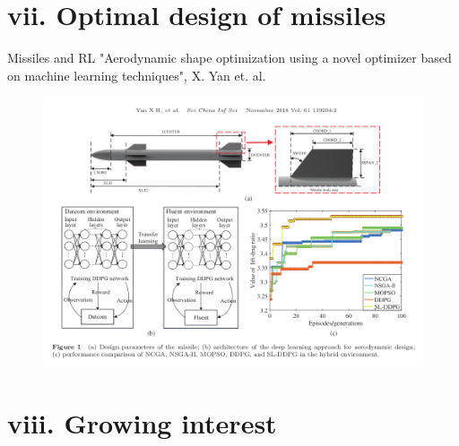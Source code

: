 \documentclass{beamer}
\begin{document}
\section{vii. Optimal design of missiles}

\begin{frame}{Missiles and RL}
"Aerodynamic shape optimization using a novel optimizer based on machine learning techniques", X. Yan et. al. \\
    
    \begin{figure}
    \begin{center}
      \includegraphics[width=.95\textwidth]{Figures/MissileOptimization} \\
    \end{center}
    \end{figure}
\end{frame}

\section{viii. Growing interest}
\end{document}
